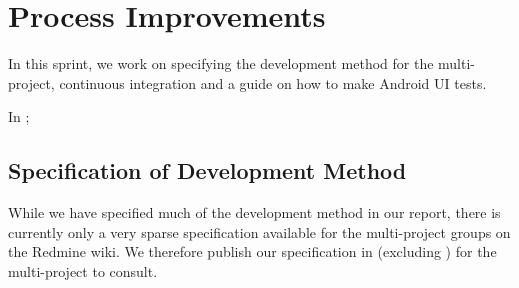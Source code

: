 \chapter{Process Improvements}
In this sprint, we work on specifying the development method for the multi-project, continuous integration and a guide on how to make Android UI tests.

\begin{chapterorganization}
  \item In \dummy;
\end{chapterorganization}

\section{Specification of Development Method}
While we have specified much of the development method in our report, there is currently only a very sparse specification available for the multi-project groups on the Redmine wiki. We therefore publish our specification in  (excluding ) for the multi-project to consult.

